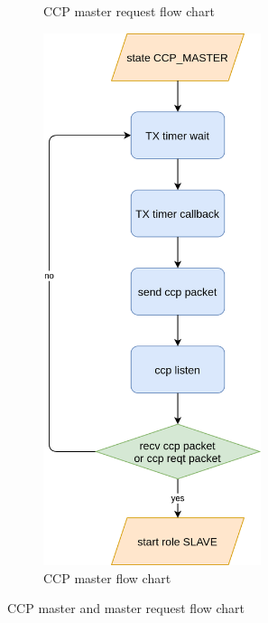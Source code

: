 \documentclass[\main/main.tex]{subfiles}
\begin{document}
\begin{figure}
\begin{subfigure}[b]{0.47\textwidth}
\begin{center}
        \end{center}
        \caption{CCP master request flow chart}
        \label{fig:ccp_master_reqt_flow_chart}
    \end{subfigure}
    \hfill
    \begin{subfigure}[b]{0.47\textwidth}
        \begin{center}
            \includegraphics[width=0.7\textwidth]{ccp_master_flow_chart.png}
        \end{center}
        \caption{CCP master flow chart}
        \label{fig:ccp_master_flow_chart}
    \end{subfigure}
    \caption{CCP master and master request flow chart}
\end{figure}
\end{document}
